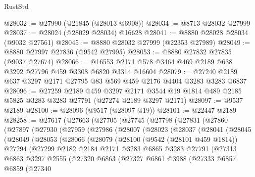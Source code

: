 \begin{lexlean}{RustStd}
\begin{coremodule}
@28032 := @27990 (@21845 (@28013 @6908))
@28034 := @8713 @28032 @27999
@28037 := @28024 (@28029 @28034) @16628
@28041 := @8880 @28028 @28034 (@9032 @27561)
@28045 := @8880 @28032 @27999 (@22353 @27989)
@28049 := @8880 @27997 @27836 (@9542 @27995)
@28053 := @8880 @27832 @27835 (@9037 @27674)
@28066 := @16553 @2171 @578 @3464 @469 @2189 @638 @3292 @27796 @459 @3308 @6820 @3314 @16604
@28079 := @27240 @2189 @637 @3297 @2171 @27795 @83 @569 @459 @2176 @4404 @3283 @3283 @6837
@28096 := @27259
    @2189
    @459
    @3297
    @2171
    @3544
    @19
    @1814
    @489
    @2185
    @5825
    @3283
    @3283
    @27791
    (@27274 @2189 @3297 @2171)
@28097 := @9537 @2189
@28100 := @28096 (@9517 (@28097 @19))
@28101 := @22447 @2189
@28258 := @27617
    (@27663
      (@27705
        (@27745
          (@27798
            (@27831
              (@27860
                (@27897
                  (@27930
                    (@27959
                      (@27986
                        (@28007
                          (@28023
                            (@28037
                              (@28041
                                (@28045
                                  (@28049
                                    (@28053
                                      (@28066
                                        (@28079
                                          (@28100
                                            (@9542 (@28101 @459 @1814))
                                            @27294
                                            (@27299
                                              @2182
                                              @2184
                                              @2171
                                              @3283
                                              @6865
                                              @3283
                                              @27791
                                              (@27313
                                                @6863
                                                @3297
                                                @2555
                                                (@27320
                                                  @6863
                                                  (@27327
                                                    @6861
                                                    @3988
                                                    (@27333
                                                      @6857
                                                      @6859
                                                      (@27340

\end{coremodule}
\end{lexlean}
